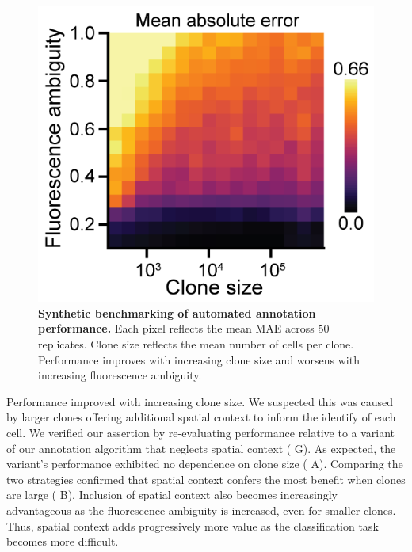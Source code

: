 \documentclass[10pt,letterpaper]{article}
\begin{document}
\begin{figure}[t]
\centering
\includegraphics[scale=1.0]{figure_5}
\caption{\textbf{Synthetic benchmarking of automated annotation performance.}
Each pixel reflects the mean MAE across 50 replicates. Clone size reflects the mean number of cells per clone. Performance improves with increasing clone size and worsens with increasing fluorescence ambiguity.}
\label{fig5}
\end{figure}

Performance improved with increasing clone size. We suspected this was caused by larger clones offering additional spatial context to inform the identify of each cell. We verified our assertion by re-evaluating performance relative to a variant of our annotation algorithm that neglects spatial context ( G). As expected, the variant's performance exhibited no dependence on clone size ( A). Comparing the two strategies confirmed that spatial context confers the most benefit when clones are large ( B). Inclusion of spatial context also becomes increasingly advantageous as the fluorescence ambiguity is increased, even for smaller clones. Thus, spatial context adds progressively more value as the classification task becomes more difficult.
\end{document}
